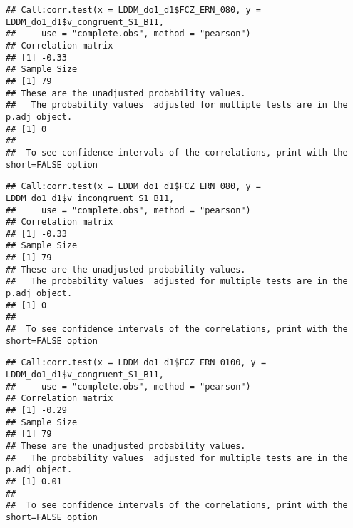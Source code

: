 \documentclass[
]{article}
\newenvironment{Shaded}{\begin{snugshade}}{\end{snugshade}}
\newcommand{\AttributeTok}[1]{\textcolor[rgb]{0.77,0.63,0.00}{#1}}
\newcommand{\FunctionTok}[1]{\textcolor[rgb]{0.00,0.00,0.00}{#1}}
\newcommand{\NormalTok}[1]{#1}
\newcommand{\SpecialCharTok}[1]{\textcolor[rgb]{0.00,0.00,0.00}{#1}}
\newcommand{\StringTok}[1]{\textcolor[rgb]{0.31,0.60,0.02}{#1}}
\begin{document}
\begin{verbatim}
## Call:corr.test(x = LDDM_do1_d1$FCZ_ERN_080, y = LDDM_do1_d1$v_congruent_S1_B11, 
##     use = "complete.obs", method = "pearson")
## Correlation matrix 
## [1] -0.33
## Sample Size 
## [1] 79
## These are the unadjusted probability values.
##   The probability values  adjusted for multiple tests are in the p.adj object. 
## [1] 0
## 
##  To see confidence intervals of the correlations, print with the short=FALSE option
\end{verbatim}

\begin{Shaded}
\end{Shaded}

\begin{verbatim}
## Call:corr.test(x = LDDM_do1_d1$FCZ_ERN_080, y = LDDM_do1_d1$v_incongruent_S1_B11, 
##     use = "complete.obs", method = "pearson")
## Correlation matrix 
## [1] -0.33
## Sample Size 
## [1] 79
## These are the unadjusted probability values.
##   The probability values  adjusted for multiple tests are in the p.adj object. 
## [1] 0
## 
##  To see confidence intervals of the correlations, print with the short=FALSE option
\end{verbatim}

\begin{Shaded}
\end{Shaded}

\begin{verbatim}
## Call:corr.test(x = LDDM_do1_d1$FCZ_ERN_0100, y = LDDM_do1_d1$v_congruent_S1_B11, 
##     use = "complete.obs", method = "pearson")
## Correlation matrix 
## [1] -0.29
## Sample Size 
## [1] 79
## These are the unadjusted probability values.
##   The probability values  adjusted for multiple tests are in the p.adj object. 
## [1] 0.01
## 
##  To see confidence intervals of the correlations, print with the short=FALSE option
\end{verbatim}
\end{document}

